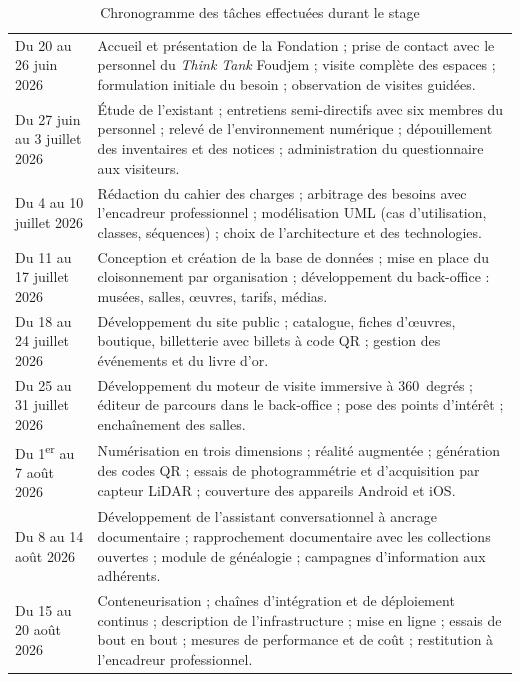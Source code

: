 \begin{table}[htbp]
\centering
\caption{Chronogramme des tâches effectuées durant le stage}
\label{tab:chronogramme}
\footnotesize
\begin{tabularx}{\textwidth}{|L{3.4cm}|X|}
\hline
{}
 &  \\ \hline
Du 20 au 26 juin 2026 &
Accueil et présentation de la Fondation ; prise de contact avec le personnel du
\emph{Think Tank} Foudjem ; visite complète des espaces ; formulation initiale
du besoin ; observation de visites guidées. \\ \hline
Du 27 juin au 3 juillet 2026 &
Étude de l'existant ; entretiens semi-directifs avec six membres du personnel ;
relevé de l'environnement numérique ; dépouillement des inventaires et des
notices ; administration du questionnaire aux visiteurs. \\ \hline
Du 4 au 10 juillet 2026 &
Rédaction du cahier des charges ; arbitrage des besoins avec l'encadreur
professionnel ; modélisation UML (cas d'utilisation, classes, séquences) ;
choix de l'architecture et des technologies. \\ \hline
Du 11 au 17 juillet 2026 &
Conception et création de la base de données ; mise en place du cloisonnement
par organisation ; développement du back-office : musées, salles, œuvres,
tarifs, médias. \\ \hline
Du 18 au 24 juillet 2026 &
Développement du site public ; catalogue, fiches d'œuvres, boutique,
billetterie avec billets à code QR ; gestion des événements et du livre d'or. \\ \hline
Du 25 au 31 juillet 2026 &
Développement du moteur de visite immersive à 360~degrés ; éditeur de parcours
dans le back-office ; pose des points d'intérêt ; enchaînement des salles. \\ \hline
Du 1\textsuperscript{er} au 7 août 2026 &
Numérisation en trois dimensions ; réalité augmentée ; génération des codes QR ;
essais de photogrammétrie et d'acquisition par capteur LiDAR ; couverture des
appareils Android et iOS. \\ \hline
Du 8 au 14 août 2026 &
Développement de l'assistant conversationnel à ancrage documentaire ;
rapprochement documentaire avec les collections ouvertes ; module de généalogie ;
campagnes d'information aux adhérents. \\ \hline
Du 15 au 20 août 2026 &
Conteneurisation ; chaînes d'intégration et de déploiement continus ;
description de l'infrastructure ; mise en ligne ; essais de bout en bout ;
mesures de performance et de coût ; restitution à l'encadreur professionnel. \\ \hline
\end{tabularx}
\end{table}

